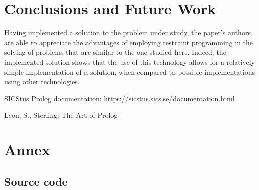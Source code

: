 \documentclass{llncs}
\begin{document}
 \section{Conclusions and Future Work}
 Having implemented a solution to the problem under study, the paper's authors are able to appreciate the advantages of employing restraint programming in the solving of problems that are similar to the one studied here. Indeed, the implemented solution shows that the use of this technology allows for a relatively simple implementation of a solution, when compared to possible implementations using other technologies.
 
%
%
\begin{thebibliography}{2}
%


SICStus Prolog documentation:
https://sicstus.sics.se/documentation.html

Leon, S., Sterling:
The Art of Prolog

\end{thebibliography}

\section{Annex}

\subsection{Source code}
\end{document}
